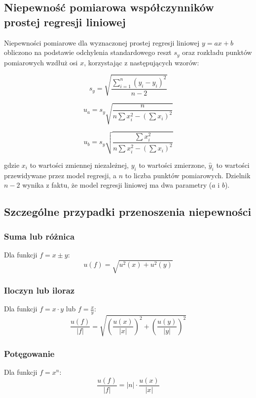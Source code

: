 \documentclass[a4paper,12pt]{article}
\begin{document}
\subsection{Niepewność pomiarowa współczynników prostej regresji liniowej}

Niepewności pomiarowe dla wyznaczonej prostej regresji liniowej $y = ax + b$ obliczono na podstawie odchylenia standardowego reszt $s_y$ oraz rozkładu punktów pomiarowych wzdłuż osi $x$, korzystając z następujących wzorów:

\[
    s_y = \sqrt{\frac{\sum_{i=1}^{n} (y_i - \hat{y}_i)^2}{n-2}}
\]

\[
    u_a = s_y \sqrt{\frac{n}{n \sum x_i^2 - \left( \sum x_i \right)^2}}
\]

\[
    u_b = s_y \sqrt{\frac{\sum x_i^2}{n \sum x_i^2 - \left( \sum x_i \right)^2}}
\]

gdzie $x_i$ to wartości zmiennej niezależnej, $y_i$ to wartości zmierzone, $\hat{y}_i$ to wartości przewidywane przez model regresji, a $n$ to liczba punktów pomiarowych. Dzielnik $n-2$ wynika z faktu, że model regresji liniowej ma dwa parametry ($a$ i $b$).

\subsection{Szczególne przypadki przenoszenia niepewności}

\subsubsection{Suma lub różnica}
Dla funkcji $f = x \pm y$:
\begin{equation}
    u(f) = \sqrt{u^2(x) + u^2(y)}
\end{equation}

\subsubsection{Iloczyn lub iloraz}
Dla funkcji $f = x \cdot y$ lub $f = \frac{x}{y}$:
\begin{equation}
    \frac{u(f)}{|f|} = \sqrt{\left(\frac{u(x)}{|x|}\right)^2 + \left(\frac{u(y)}{|y|}\right)^2}
\end{equation}

\subsubsection{Potęgowanie}
Dla funkcji $f = x^n$:
\begin{equation}
    \frac{u(f)}{|f|} = |n| \cdot \frac{u(x)}{|x|}
\end{equation}
\end{document}
